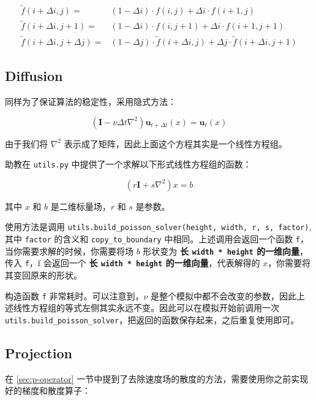 \documentclass{ctexart}
\begin{document}
\begin{equation}
  \begin{split}
    \tilde f(i+\Delta i,j) = & (1-\Delta i) \cdot f(i, j) + \Delta i \cdot f(i + 1, j) \\
    \tilde f(i+\Delta i,j+1) = & (1-\Delta i) \cdot f(i, j+1) + \Delta i \cdot f(i + 1, j+1) \\
    \tilde f(i+\Delta i,j + \Delta j) = & (1-\Delta j) \cdot \tilde f(i + \Delta i, j) + \Delta j \cdot \tilde f(i + \Delta i, j + 1)
  \end{split}
\end{equation}

\subsection{Diffusion}

同样为了保证算法的稳定性，采用隐式方法：

\begin{equation}
(\textbf{I} - \nu \Delta t \nabla^2) \mathbf{u}_{t+\Delta t}(x) = \mathbf{u}_t (x)
\end{equation}

由于我们将 $\nabla ^ 2$ 表示成了矩阵，因此上面这个方程其实是一个线性方程组。

助教在 \texttt{utils.py} 中提供了一个求解以下形式线性方程组的函数：

\begin{equation}
(r \textbf{I} + s \nabla^2) x = b
\end{equation}

其中 $x$ 和 $b$ 是二维标量场，$r$ 和 $s$ 是参数。

使用方法是调用 \texttt{utils.build\_poisson\_solver(height, width, r, s, factor)}, 其中 \texttt{factor} 的含义和 \texttt{copy\_to\_boundary} 中相同。上述调用会返回一个函数 \texttt{f}，当你需要求解的时候，你需要将场 $b$ 形状变为 \textbf{长 \texttt{width * height} 的一维向量}，传入 \texttt{f}，f 会返回一个 \textbf{长 \texttt{width * height} 的一维向量}，代表解得的 $x$，你需要将其变回原来的形状。

构造函数 \texttt{f} 非常耗时。可以注意到，$\nu$ 是整个模拟中都不会改变的参数，因此上述线性方程组的等式左侧其实永远不变。因此可以在模拟开始前调用一次 \texttt{utils.build\_poisson\_solver}，把返回的函数保存起来，之后重复使用即可。

\subsection{Projection}
在 \ref{sec:p-operator} 一节中提到了去除速度场的散度的方法，需要使用你之前实现好的梯度和散度算子：
\end{document}
